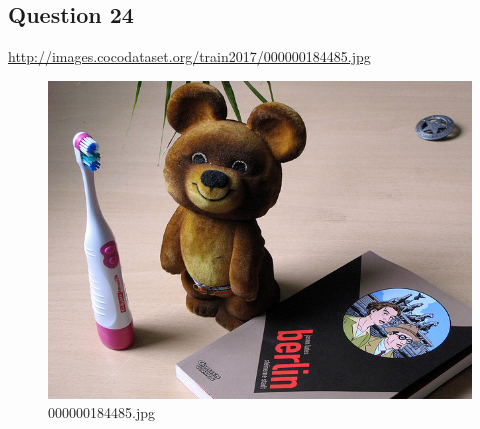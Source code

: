 \subsection*{Question 24}
\url{http://images.cocodataset.org/train2017/000000184485.jpg}
    \begin{figure}[h]
        \centering
        \includegraphics[width=0.8\linewidth]{../image set/easy/000000184485.jpg}
        \caption{000000184485.jpg}
    \end{figure}
